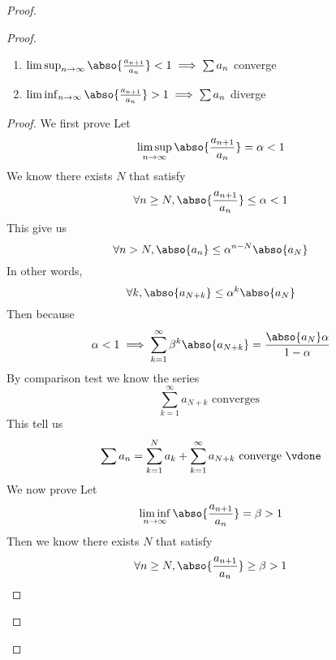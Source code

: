 \documentclass{report}
\begin{document}
\begin{proof}
\begin{proof}
\begin{theorem}
\begin{enumerate}[label=(\alph*)]
  \item  $\limsup_{n\to\infty} \abso{\frac{a_{n+1}}{a_n}}<1\implies \sum a_n$ converge\\
  \item $\liminf_{n\to\infty} \abso{\frac{a_{n+1}}{a_n}}> 1\implies \sum a_n$ diverge
\end{enumerate}
\end{theorem}
\begin{proof}
We first prove 
Let 
\begin{equation*}
\limsup_{n\to\infty} \abso{\frac{a_{n+1}}{a_n}}=\alpha <1
\end{equation*}
We know there exists $N$ that satisfy
 \begin{equation*}
\forall n\geq N, \abso{\frac{a_{n+1}}{a_n}}\leq \alpha <1
\end{equation*}
This give us
\begin{equation*}
\forall n>N, \abso{a_n}\leq \alpha ^{n-N}\abso{a_N}
\end{equation*}
In other words,
\begin{equation*}
\forall k, \abso{a_{N+k}}\leq \alpha ^{k}\abso{a_N}
\end{equation*}
Then because
\begin{equation*}
\alpha <1\implies \sum_{k=1}^\infty \beta^{k} \abso{a_{N+k}}=\frac{\abso{a_N}\alpha  }{1-\alpha  }
\end{equation*}
By comparison test we know the series
\begin{equation*}
\sum_{k=1}^\infty a_{N+k}\text{ converges }
\end{equation*}
This tell us
\begin{equation*}
\sum a_n=\sum_{k=1}^N a_k+ \sum_{k=1}^\infty a_{N+k}\text{ converge }\vdone
\end{equation*}
We now prove 
Let 
\begin{equation*}
\liminf_{n\to\infty} \abso{\frac{a_{n+1}}{a_n}}=\beta >1
\end{equation*}
Then we know there exists $N$ that satisfy
 \begin{equation*}
\forall n\geq N, \abso{\frac{a_{n+1}}{a_n}}\geq \beta >1

\end{equation*}
\end{proof}
\end{proof}
\end{proof}
\end{document}

